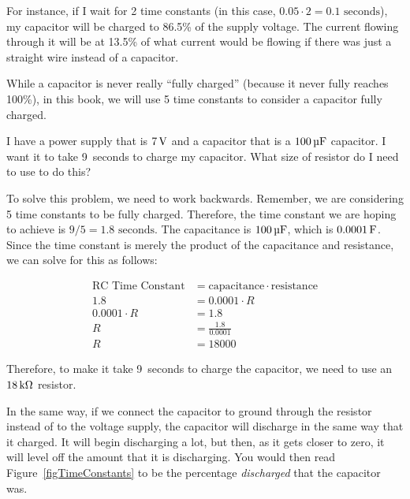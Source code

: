 For instance, if I wait for 2 time constants (in this case, $0.05 \cdot 2 = 0.1\textrm{ seconds}$), my capacitor will be charged to 86.5\% of the supply voltage.
The current flowing through it will be at 13.5\% of what current would be flowing if there was just a straight wire instead of a capacitor.

While a capacitor is never really ``fully charged'' (because it never fully reaches 100\%), in this book, we will use 5 time constants to consider a capacitor fully charged.

\begin{exampleprob}
I have a power supply that is $7\,\si{\volt}$ and a capacitor that is a $100\,\si{\micro\farad}$ capacitor.
I want it to take 9~seconds to charge my capacitor.
What size of resistor do I need to use to do this?

To solve this problem, we need to work backwards.
Remember, we are considering 5 time constants to be fully charged.
Therefore, the time constant we are hoping to achieve is $9 / 5 = 1.8\textrm{ seconds}$.
The capacitance is $100\,\si{\micro\farad}$, which is $0.0001\,\si{\farad}$.
Since the time constant is merely the product of the capacitance and resistance, we can solve for this as follows:

\begin{align*}
\textrm{RC Time Constant} &= \textrm{capacitance} \cdot \textrm{resistance} \\
1.8 &= 0.0001 \cdot R \\
0.0001 \cdot R &= 1.8 \\
R &= \frac{1.8}{0.0001} \\
R &= 18000
\end{align*}

Therefore, to make it take 9~seconds to charge the capacitor, we need to use an $18\,\si{\kilo\ohm}$ resistor.
\end{exampleprob}

In the same way, if we connect the capacitor to ground through the resistor instead of to the voltage supply, the capacitor will discharge in the same way that it charged.
It will begin discharging a lot, but then, as it gets closer to zero, it will level off the amount that it is discharging.
You would then read Figure~\ref{figTimeConstants} to be the percentage \emph{discharged} that the capacitor was.

